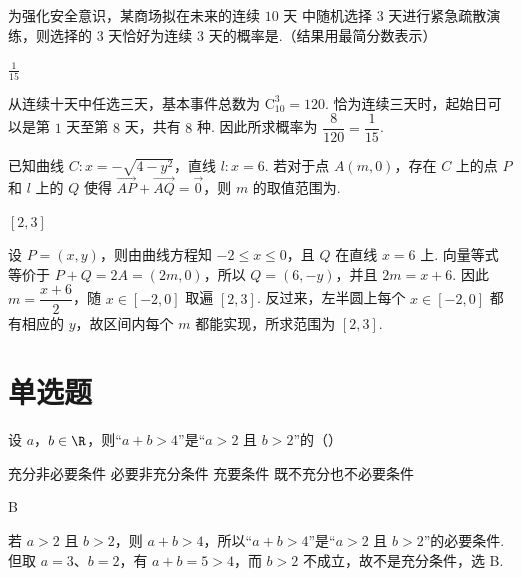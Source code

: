 \begin{problem}
为强化安全意识，某商场拟在未来的连续 \(10\text{ 天}\) 中随机选择 \(3\text{ 天}\)进行紧急疏散演练，则选择的 \(3\text{ 天}\)恰好为连续 \(3\text{ 天}\)的概率是\fillinblank{}.（结果用最简分数表示）

\begin{answer}
\(\frac{1}{15}\)
\end{answer}

\begin{solution}
从连续十天中任选三天，基本事件总数为 \(\mathrm C_{10}^{3}=120\). 恰为连续三天时，起始日可以是第 \(1\) 天至第 \(8\) 天，共有 \(8\) 种. 因此所求概率为 \(\dfrac{8}{120}=\dfrac1{15}\).
\end{solution}
\end{problem}

\begin{problem}
已知曲线 \(C: x = -\sqrt{4 - y^2}\)，直线 \(l: x = 6\). 若对于点 \(A(m,0)\)，存在 \(C\) 上的点 \(P\) 和 \(l\) 上的 \(Q\) 使得 \(\overrightarrow{AP} + \overrightarrow{AQ} = \overrightarrow{0}\)，则 \(m\) 的取值范围为\fillinblank{}.

\begin{answer}
\([2,3]\)
\end{answer}

\begin{solution}
设 \(P=(x,y)\)，则由曲线方程知 \(-2\leqslant x\leqslant0\)，且 \(Q\) 在直线 \(x=6\) 上. 向量等式等价于 \(P+Q=2A=(2m,0)\)，所以 \(Q=(6,-y)\)，并且 \(2m=x+6\). 因此 \(m=\dfrac{x+6}{2}\)，随 \(x\in[-2,0]\) 取遍 \([2,3]\). 反过来，左半圆上每个 \(x\in[-2,0]\) 都有相应的 \(y\)，故区间内每个 \(m\) 都能实现，所求范围为 \([2,3]\).
\end{solution}
\end{problem}

\section{单选题}

\begin{problem}
设 \(a\)，\(b \in \R\)，则“\(a + b > 4\)”是“\(a > 2\) 且 \(b > 2\)”的（\quad）

\choices
    {充分非必要条件}
    {必要非充分条件}
    {充要条件}
    {既不充分也不必要条件}

\begin{answer}
B
\end{answer}

\begin{solution}
若 \(a>2\) 且 \(b>2\)，则 \(a+b>4\)，所以“\(a+b>4\)”是“\(a>2\) 且 \(b>2\)”的必要条件. 但取 \(a=3\)、\(b=2\)，有 \(a+b=5>4\)，而 \(b>2\) 不成立，故不是充分条件，选 B.
\end{solution}
\end{problem}

